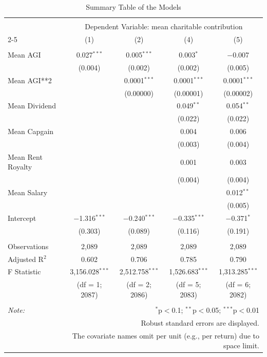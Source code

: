 \documentclass[
  letterpaper,
  DIV=11,
  numbers=noendperiod]{scrartcl}
\begin{document}
\begin{table}[!htbp] \centering 
  \caption{Summary Table of the Models} 
  \label{} 
\tiny 
\begin{tabular}{@{\extracolsep{.001pt}}lcccc} 
\\[-1.8ex]\hline 
\hline \\[-1.8ex] 
 & \multicolumn{4}{c}{Dependent Variable: mean charitable contribution} \\ 
\cline{2-5} 
 & (1) & (2) & (4) & (5) \\ 
\hline \\[-1.8ex] 
 Mean AGI & 0.027$^{***}$ & 0.005$^{***}$ & 0.003$^{*}$ & $-$0.007 \\ 
  & (0.004) & (0.002) & (0.002) & (0.005) \\ 
  Mean AGI**2 &  & 0.0001$^{***}$ & 0.0001$^{***}$ & 0.0001$^{***}$ \\ 
  &  & (0.00000) & (0.00001) & (0.00002) \\ 
  Mean Dividend &  &  & 0.049$^{**}$ & 0.054$^{**}$ \\ 
  &  &  & (0.022) & (0.022) \\ 
  Mean Capgain &  &  & 0.004 & 0.006 \\ 
  &  &  & (0.003) & (0.004) \\ 
  Mean Rent Royalty &  &  & 0.001 & 0.003 \\ 
  &  &  & (0.004) & (0.004) \\ 
  Mean Salary &  &  &  & 0.012$^{**}$ \\ 
  &  &  &  & (0.005) \\ 
  Intercept & $-$1.316$^{***}$ & $-$0.240$^{***}$ & $-$0.335$^{***}$ & $-$0.371$^{*}$ \\ 
  & (0.303) & (0.089) & (0.116) & (0.191) \\ 
 \hline \\[-1.8ex] 
Observations & 2,089 & 2,089 & 2,089 & 2,089 \\ 
Adjusted R$^{2}$ & 0.602 & 0.706 & 0.785 & 0.790 \\ 
F Statistic & 3,156.028$^{***}$  & 2,512.758$^{***}$  & 1,526.683$^{***}$  & 1,313.285$^{***}$  \\ 
 & (df = 1; 2087) & (df = 2; 2086) & (df = 5; 2083) & (df = 6; 2082) \\
\hline 
\hline \\[-1.8ex] 
\textit{Note:}  & \multicolumn{4}{r}{$^{*}$p$<$0.1; $^{**}$p$<$0.05; $^{***}$p$<$0.01} \\ 
 & \multicolumn{4}{r}{Robust standard errors are displayed.} \\ 
 & \multicolumn{4}{r}{The covariate names omit per unit (e.g., per return) due to space limit.} \\ 
\end{tabular} 
\end{table}
\end{document}

